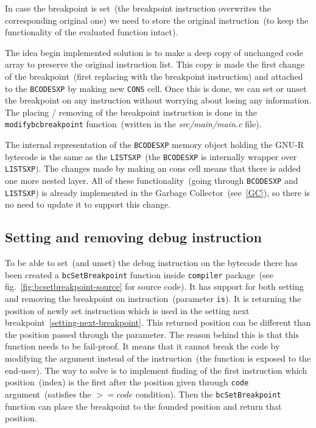 \documentclass[thesis=M,english]{FITthesis}[2018/10/20]
\newcommand{\code}[1]{\texttt{#1}}
\begin{document}
In case the breakpoint is set~(the breakpoint instruction overwrites the corresponding original one) we need to store the original instruction~(to keep the functionality of the evaluated function intact).

The idea begin implemented solution is to make a deep copy of unchanged code array to preserve the original instruction list. This copy is made the first change of the breakpoint~(first replacing with the breakpoint instruction) and attached to the \code{BCODESXP} by making new \code{CONS} cell. Once this is done, we can set or unset the breakpoint on any instruction without worrying about losing any information. The placing / removing of the breakpoint instruction is done in the \code{modifybcbreakpoint} function~(written in the \textit{src/main/main.c} file).

The internal representation of the \code{BCODESXP} memory object holding the GNU-R bytecode is the same as the \code{LISTSXP}~(the \code{BCODESXP} is internally wrapper over \code{LISTSXP}). The changes made by making an cons cell means that there is added one more nested layer. All of these functionality~(going through \code{BCODESXP} and \code{LISTSXP}) is already implemented in the Garbage Collector~(see~\ref{GC}), so there is no need to update it to support this change.

\subsection{Setting and removing debug instruction}\label{setting-and-unsetting-debug-instruction}

To be able to set~(and unset) the debug instruction on the bytecode there has been created a \code{bcSetBreakpoint} function inside \code{compiler} package~(see fig.~\ref{fig:bcsetbreakpoint-source} for source code). It has support for both setting and removing the breakpoint on instruction~(parameter \code{is}). It is returning the position of newly set instruction which is used in the setting next breakpoint~\ref{setting-next-breakpoint}. This returned position can be different than the position passed through the parameter. The reason behind this is that this function needs to be fail-proof. It means that it cannot break the code by modifying the argument instead of the instruction~(the function is exposed to the end-user). The way to solve is to implement finding of the first instruction which position~(index) is the first after the position given through \code{code} argument~(satisfies the \code{$>= code$} condition). Then the \code{bcSetBreakpoint} function can place the breakpoint to the founded position and return that position.
\end{document}
